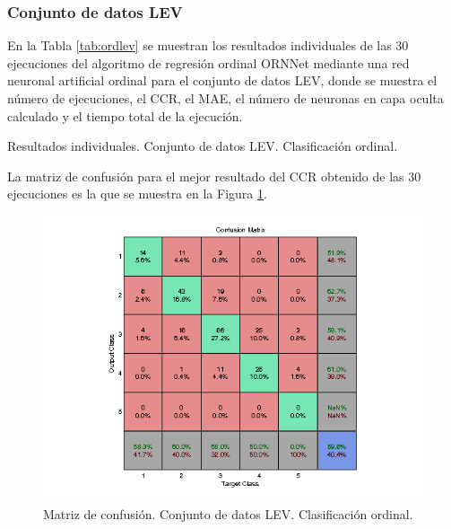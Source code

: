 			\subsubsection{Conjunto de datos LEV}
			
			En la Tabla \ref{tab:ordlev} se muestran los resultados individuales de las 30 ejecuciones del algoritmo de regresión ordinal ORNNet mediante una red neuronal artificial ordinal para el conjunto de datos LEV, donde se muestra el número de ejecuciones, el CCR, el MAE, el número de neuronas en capa oculta calculado y el tiempo total de la ejecución.\\
			
			\begin{table}[!htbp]
				\centering
				\caption{Resultados individuales. Conjunto de datos LEV. Clasificación ordinal.}
				\label{tab:ordlev}
			\end{table}
			
			La matriz de confusión para el mejor resultado del CCR obtenido de las 30 ejecuciones es la que se muestra en la Figura \ref{fig:ordlev}.
			
			\begin{figure}[htbp]
				\centering
				\includegraphics[scale=0.8]{../src/results/ordinal/LEV_mc1.png}
				\caption{Matriz de confusión. Conjunto de datos LEV. Clasificación ordinal.}
				\label{fig:ordlev}
			\end{figure}
			
